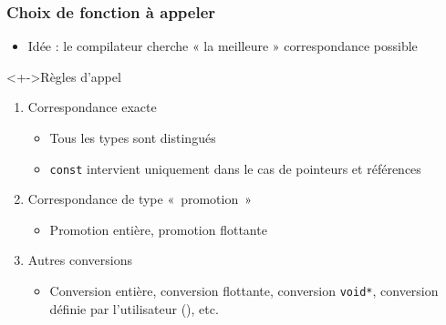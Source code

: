 \begin{frame}
\frametitle{Choix de fonction à appeler}
\begin{itemize}[<+->]
\item Idée : le compilateur cherche « la meilleure » correspondance possible
\end{itemize}
\begin{alertblock}<+->{Règles d'appel}
	\begin{enumerate}[<+->]
	\item Correspondance exacte
		\begin{itemize}
		\item Tous les types sont distingués
		\item \lstinline|const| intervient uniquement dans le cas de pointeurs et références
		\end{itemize}
	\item Correspondance de type «~promotion~»
		\begin{itemize}
		\item Promotion entière, promotion flottante
		\end{itemize}
	\item Autres conversions
		\begin{itemize}
		\item Conversion entière, conversion flottante, conversion \lstinline|void*|, conversion définie par l'utilisateur (\cpp), etc.
		\end{itemize}
	\end{enumerate}
\end{alertblock}
\end{frame}

